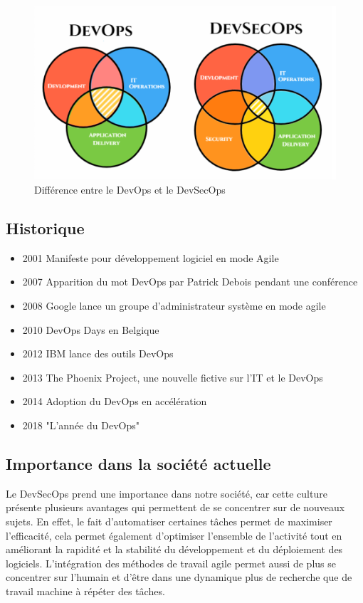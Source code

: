 \documentclass[11pt,a4paper,oneside]{book}
\begin{document}
\begin{figure}[h]
\centering
\includegraphics[scale=1]{devops-vs-devsecops}
\caption{Différence entre le DevOps et le DevSecOps}
\end{figure}

\subsection{Historique}

\begin{itemize}
\item 2001 Manifeste pour développement logiciel en mode Agile
\item 2007 Apparition du mot DevOps par Patrick Debois pendant une conférence
\item 2008 Google lance un groupe d'administrateur système en mode agile
\item 2010 DevOps Days en Belgique
\item 2012 IBM lance des outils DevOps
\item 2013 The Phoenix Project, une nouvelle fictive sur l'IT et le DevOps
\item 2014 Adoption du DevOps en accélération
\item 2018 "L'année du DevOps"
\end{itemize}

\subsection{Importance dans la société actuelle}

Le DevSecOps prend une importance dans notre société, car cette culture présente plusieurs avantages qui permettent de se concentrer sur de nouveaux sujets.
En effet, le fait d'automatiser certaines tâches permet de maximiser l'efficacité, cela permet également d'optimiser l'ensemble de l'activité tout en améliorant la rapidité et la stabilité du développement et du déploiement des logiciels.
L'intégration des méthodes de travail agile permet aussi de plus se concentrer sur l'humain et d'être dans une dynamique plus de recherche que de travail machine à répéter des tâches.
\end{document}
